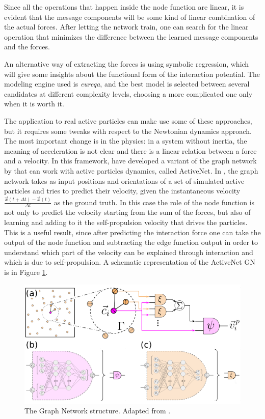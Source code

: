 \documentclass[../../master_thesis_np.tex]{subfiles}
\begin{document}
	Since all the operations that happen inside the node function are linear, it is evident that the message components will be some kind of linear combination of the actual forces. 
	After letting the network train, one can search for the linear operation that minimizes the difference between the learned message components and the forces. 
	
	An alternative way of extracting the forces is using symbolic regression, which will give some insights about the functional form of the interaction potential. 
	The modeling engine used is \emph{eureqa}, and the best model is selected between several candidates at different complexity levels, choosing a more complicated one only when it is worth it.
	
	The application to real active particles can make use some of these approaches, but it requires some tweaks with respect to the Newtonian dynamics approach. 
	The most important change is in the physics: in a system without inertia, the meaning of acceleration is not clear and there is a linear relation between a force and a velocity. 
	In this framework, \citeauthor{ruiz-garcia_discovering_2024} have developed a variant of the graph network by \citeauthor{cranmer_discovering_2020} that can work with active particles dynamics, called ActiveNet. 
	In \cite{ruiz-garcia_discovering_2024}, the graph network takes as input positions and orientations of a set of simulated active particles and tries to predict their velocity, given the instantaneous velocity $\frac{\vec{x}(t + \Delta t) - \vec{x}(t)}{\Delta t}$ as the ground truth. 
	In this case the role of the node function is not only to predict the velocity starting from the sum of the forces, but also of learning and adding to it the self-propulsion velocity that drives the particles. 
	This is a useful result, since after predicting the interaction force one can take the output of the node function and subtracting the edge function output in order to understand which part of the velocity can be explained through interaction and which is due to self-propulsion.
	A schematic representation of the ActiveNet GN is in Figure \ref{fig:ruiz1}.
	\begin{figure}[htp]
		\centering
		\includegraphics[width=\singfigwidth]{ruiz1.png}
		\caption{The Graph Network structure. Adapted from \cite{ruiz-garcia_discovering_2024}.}
		\label{fig:ruiz1}
	\end{figure}
\end{document}
